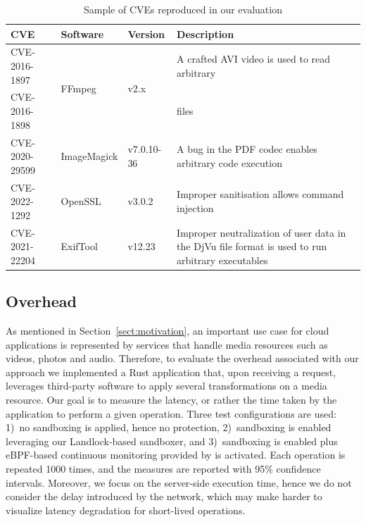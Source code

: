 \begin{table}[!t]
  \footnotesize
  \caption{\label{table:cve} Sample of CVEs reproduced in our evaluation}
  \setlength{\tabcolsep}{0.2cm}
  \begin{tabularx}{\columnwidth}{ l l l >{\raggedright\arraybackslash}X}
    \toprule
    {\bf CVE} & {\bf Software} & {\bf Version} & {\bf Description}\\
    \toprule
    CVE-2016-1897  & \multirow{2}{*}{FFmpeg} & \multirow{2}{*}{v2.x} & A crafted AVI video is used to read arbitrary \\
    CVE-2016-1898  & & & files \\
    \midrule
    CVE-2020-29599  & ImageMagick  & v7.0.10-36  & A bug in the PDF codec enables arbitrary code execution \\
    \midrule
    CVE-2022-1292  & OpenSSL  & v3.0.2 & Improper sanitisation allows command injection \\
    \midrule
    CVE-2021-22204   & ExifTool        &  v12.23 & Improper neutralization of user data in the DjVu file format is used to run arbitrary executables \\
    \bottomrule
  \end{tabularx}
\end{table}

\subsection{Overhead}\label{sect:exp-perf}

As mentioned in Section~\ref{sect:motivation}, an important use case
for cloud applications is represented by services that handle media
resources such as videos, photos and audio. Therefore, to evaluate the
overhead associated with our approach we implemented a Rust
application that, upon receiving a request, leverages third-party
software to apply several transformations on a media resource. Our
goal is to measure the latency, or rather the time taken by the
application to perform a given operation. Three test configurations
are used: 1)~no sandboxing is applied, hence no protection,
2)~sandboxing is enabled leveraging our Landlock-based sandboxer, and
3)~sandboxing is enabled plus eBPF-based continuous monitoring
provided by \dmng is activated. Each operation is repeated 1000 times,
and the measures are reported with 95\% confidence intervals. Moreover, we focus on the
server-side execution time, hence we do not consider the delay
introduced by the network, which may make harder to visualize latency
degradation for short-lived operations.

